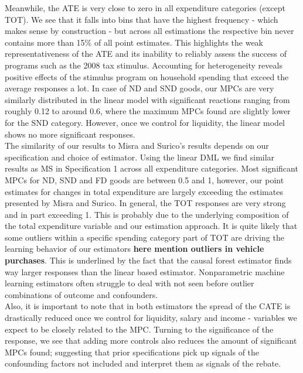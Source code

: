 Meanwhile, the ATE is very close to zero in all expenditure categories (except TOT). We see that it falls into bins that have the highest frequency - which makes sense by construction - but across all estimations the respective bin never contains more than 15\% of all point estimates. This highlights the weak representativeness of the ATE and its inability to reliably assess the success of programs such as the 2008 tax stimulus. Accounting for heterogeneity reveals positive effects of the stimulus program on household spending that exceed the average responses a lot. In case of ND and SND goods, our MPCs are very similarly distributed in the linear model with significant reactions ranging from roughly 0.12 to around 0.6, where the maximum MPCs found are slightly lower for the SND category. However, once we control for liquidity, the linear model shows no more significant responses. \\
The similarity of our results to Misra and Surico's results depends on our specification and choice of estimator. Using the linear DML we find similar results as MS in Specification 1 across all expenditure categories. Most significant MPCs for ND, SND and FD goods are between 0.5 and 1, however, our point estimates for changes in total expenditure are largely exceeding the estimates presented by Misra and Surico. In general, the TOT responses are very strong and in part exceeding 1. This is probably due to the underlying composition of the total expenditure variable and our estimation approach. It is quite likely that some outliers within a specific spending category part of TOT are driving the learning behavior of our estimators \textbf{here mention outliers in vehicle purchases}. This is underlined by the fact that the causal forest estimator finds way larger responses than the linear based estimator. Nonparametric machine learning estimators often struggle to deal with not seen before outlier combinations of outcome and confounders. \\
Also, it is important to note that in both estimators the spread of the CATE is drastically reduced once we control for liquidity, salary and income - variables we expect to be closely related to the MPC. Turning to the significance of the response, we see that adding more controls also reduces the amount of significant MPCs found; suggesting that prior specifications pick up signals of the confounding factors not included and interpret them as signals of the rebate. \\

